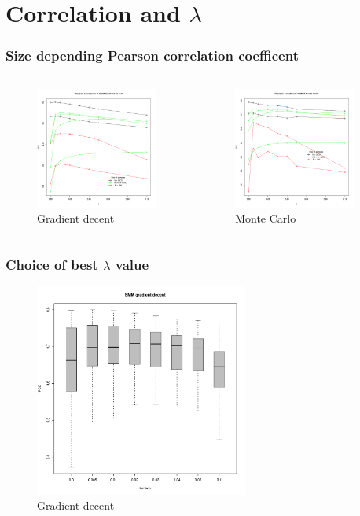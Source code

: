 \documentclass[presentation]{beamer}   %
\begin{document}
\section{Correlation and $\lambda$}
\begin{frame}
  \frametitle{Size depending Pearson correlation coefficent}
  \begin{columns}[t] %
		\begin{figure}
		\centering
			\includegraphics[width=40mm,height=40mm]{fig/smm_l005_ppc_size.pdf}
			\caption{Gradient decent}
		\end{figure}
		\begin{figure}
			\centering
			\includegraphics[width=40mm,height=40mm]{fig/smm_mc_l005_ppc_size.pdf}
			\caption{Monte Carlo}
		\end{figure}
  \end{columns}
\end{frame}

\begin{frame}[plain]
  \frametitle{Choice of best $\lambda$ value}
	\begin{figure}
	\centering
		\includegraphics[width=70mm,height=70mm]{fig/choice_lambda.pdf}
		\caption{Gradient decent}
	\end{figure}
\end{frame}
\end{document}
